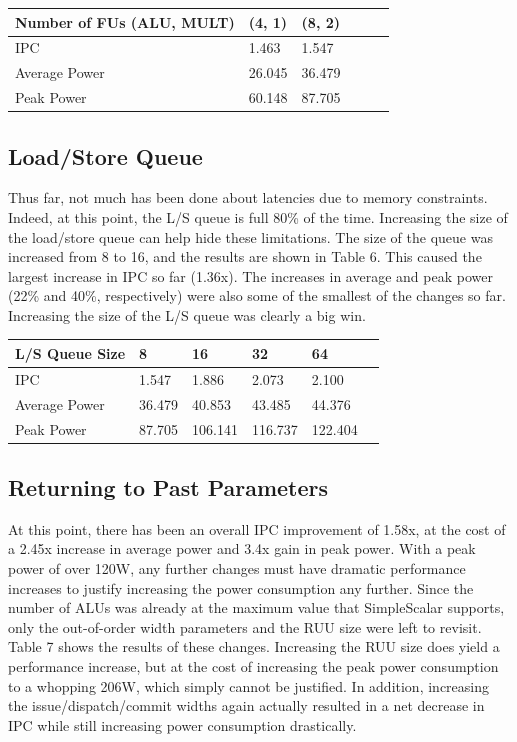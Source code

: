 \documentclass[english]{article}
\begin{document}
\begin{center}
	\vspace{.30cm}
	\begin{tabular}{ | l | l | l | l | l | l |}
		\hline
	 Number of FUs (ALU, MULT) & (4, 1) & (8, 2) \\ \hline
     IPC & 1.463 & 1.547 \\ \hline
     Average Power & 26.045 & 36.479 \\ \hline
     Peak Power & 60.148 & 87.705 \\ \hline
	\end{tabular}
\end{center}

\subsection{Load/Store Queue}
Thus far, not much has been done about latencies due to memory constraints. Indeed, at this point, the L/S queue is full 80\% of the time. Increasing the size of the load/store queue can help hide these limitations. The size of the queue was increased from 8 to 16, and the results are shown in Table 6. This caused the largest increase in IPC so far (1.36x). The increases in average and peak power (22\% and 40\%, respectively) were also some of the smallest of the changes so far. Increasing the size of the L/S queue was clearly a big win.

\begin{center}
	\vspace{.30cm}
	\begin{tabular}{ | l | l | l | l | l | l |}
		\hline
	 L/S Queue Size & 8 & 16 & 32 & 64 \\ \hline
     IPC & 1.547 & 1.886 & 2.073 & 2.100\\ \hline
     Average Power & 36.479 & 40.853 & 43.485 & 44.376 \\ \hline
     Peak Power & 87.705 & 106.141 & 116.737 & 122.404 \\ \hline
	\end{tabular}
\end{center}

\subsection{Returning to Past Parameters}
At this point, there has been an overall IPC improvement of 1.58x, at the cost of a 2.45x increase in average power and 3.4x gain in peak power. With a peak power of over 120W, any further changes must have dramatic performance increases to justify increasing the power consumption any further. Since the number of ALUs was already at the maximum value that SimpleScalar supports, only the out-of-order width parameters and the RUU size were left to revisit. Table 7 shows the results of these changes. Increasing the RUU size does yield a performance increase, but at the cost of increasing the peak power consumption to a whopping 206W, which simply cannot be justified. In addition, increasing the issue/dispatch/commit widths again actually resulted in a net decrease in IPC while still increasing power consumption drastically.
\end{document}
